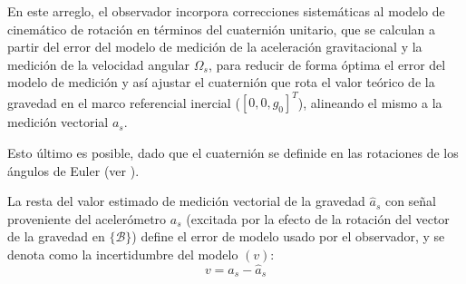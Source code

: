 \documentclass[conference]{IEEEtran}
\newcommand{\marco}[1]{\{\mathcal{#1}\}}
\begin{document}
En este arreglo, el observador incorpora correcciones sistemáticas al modelo de cinemático de rotación en términos del cuaternión unitario, que se calculan a partir del error del modelo de medición de la aceleración gravitacional y la medición de la velocidad angular $\Omega_s$, para reducir de forma óptima el error del modelo de medición y así ajustar el cuaternión que rota el valor teórico de la gravedad en el marco referencial inercial ($[0,0,g_0]^T$), alineando el mismo a la medición vectorial $a_s$.\par
Esto último es posible, dado que el cuaternión se definide en las rotaciones de los ángulos de Euler (ver \cite{Altmann1986}).\par
La resta del valor estimado de medición vectorial de la gravedad $\hat{a}_s$ con señal proveniente del acelerómetro $a_s$ (excitada por la efecto de la rotación del vector de la gravedad en $\marco{B}$) define el error de modelo usado por el observador, y se denota como la incertidumbre del modelo $(v)$:
\begin{equation}
v=a_s-\hat{a}_s
\end{equation}
\end{document}

